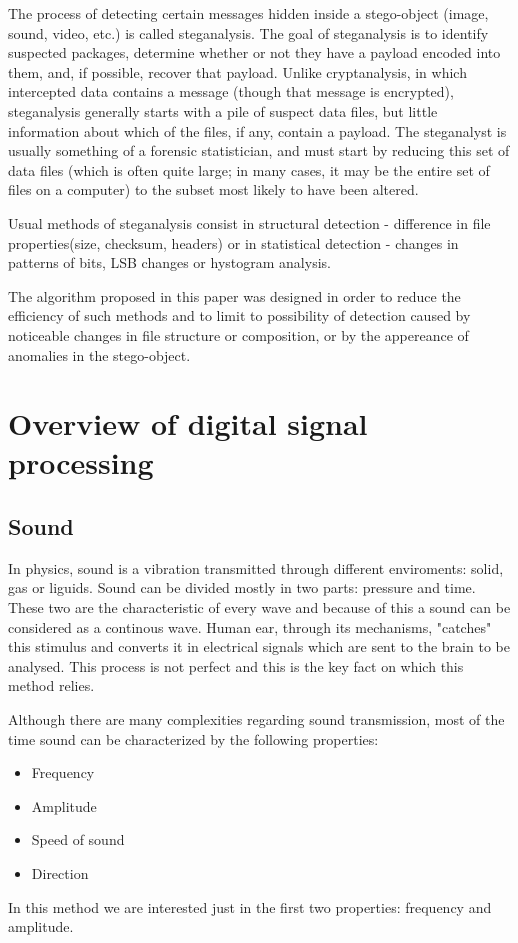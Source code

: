 \documentclass[12pt]{report}
\begin{document}
The process of detecting certain messages hidden inside a stego-object (image, sound, video, etc.) is called steganalysis. The goal of steganalysis is to identify suspected packages, determine whether or not they have a payload encoded into them, and, if possible, recover that payload. 
Unlike cryptanalysis, in which intercepted data contains a message (though that message is encrypted), steganalysis generally starts with a pile of suspect data files, but little information about which of the files, if any, contain a payload. The steganalyst is usually something of a forensic statistician, and must start by reducing this set of data files (which is often quite large; in many cases, it may be the entire set of files on a computer) to the subset most likely to have been altered.

Usual methods of steganalysis consist in structural detection - difference in file properties(size, checksum, headers) or in statistical detection - changes in patterns of bits, LSB changes or hystogram analysis.

The algorithm proposed in this paper was designed in order to reduce the efficiency of such methods and to limit to possibility of detection caused by noticeable changes in file structure or composition, or by the appereance of anomalies in the stego-object.

\section{Overview of digital signal processing}
\subsection{Sound}
In physics, sound is a vibration transmitted through different enviroments: solid, gas or liguids. Sound can be divided mostly in two parts: pressure and time. These two are the characteristic of every wave and because of this a sound can be considered as a continous wave. Human ear, through its mechanisms, "catches" this stimulus and converts it in electrical signals which are sent to the brain to be analysed. This process is not perfect and this is the key fact on which this method relies.

Although there are many complexities regarding sound transmission, most of the time sound can be characterized by the following properties:
\begin{itemize}
	\item Frequency
	\item Amplitude
	\item Speed of sound
	\item Direction
\end{itemize}
In this method we are interested just in the first two properties: frequency and amplitude.
\end{document}
